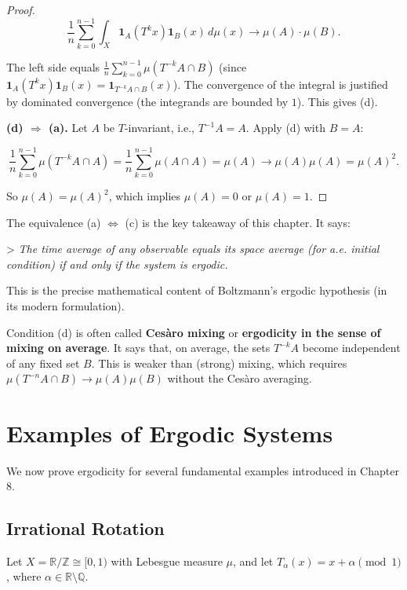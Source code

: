 \begin{proof}
\[
\frac{1}{n} \sum_{k=0}^{n-1} \int_X \mathbf{1}_A(T^k x) \mathbf{1}_B(x) \, d\mu(x) \to \mu(A) \cdot \mu(B).
\]

The left side equals $\frac{1}{n}\sum_{k=0}^{n-1} \mu(T^{-k}A \cap B)$ (since $\mathbf{1}_A(T^k x)\mathbf{1}_B(x) = \mathbf{1}_{T^{-k}A \cap B}(x)$). The convergence of the integral is justified by dominated convergence (the integrands are bounded by $1$). This gives (d).

\textbf{(d) $\Rightarrow$ (a).} Let $A$ be $T$-invariant, i.e., $T^{-1}A = A$. Apply (d) with $B = A$:

\[
\frac{1}{n} \sum_{k=0}^{n-1} \mu(T^{-k}A \cap A) = \frac{1}{n} \sum_{k=0}^{n-1} \mu(A \cap A) = \mu(A) \to \mu(A)\mu(A) = \mu(A)^2.
\]

So $\mu(A) = \mu(A)^2$, which implies $\mu(A) = 0$ or $\mu(A) = 1$.
\end{proof}


\begin{remark}
The equivalence (a) $\Leftrightarrow$ (c) is the key takeaway of this chapter. It says:

> \textit{The time average of any observable equals its space average (for a.e. initial condition) if and only if the system is ergodic.}

This is the precise mathematical content of Boltzmann's ergodic hypothesis (in its modern formulation).

Condition (d) is often called \textbf{Cesàro mixing} or \textbf{ergodicity in the sense of mixing on average}. It says that, on average, the sets $T^{-k}A$ become independent of any fixed set $B$. This is weaker than (strong) mixing, which requires $\mu(T^{-n}A \cap B) \to \mu(A)\mu(B)$ without the Cesàro averaging.
\end{remark}


\section{Examples of Ergodic Systems}\label{sec:9.7}

We now prove ergodicity for several fundamental examples introduced in Chapter 8.

\subsection{Irrational Rotation}\label{sec:9.7.1}

Let $X = \mathbb{R}/\mathbb{Z} \cong [0, 1)$ with Lebesgue measure $\mu$, and let $T_\alpha(x) = x + \alpha \pmod{1}$, where $\alpha \in \mathbb{R} \setminus \mathbb{Q}$.


